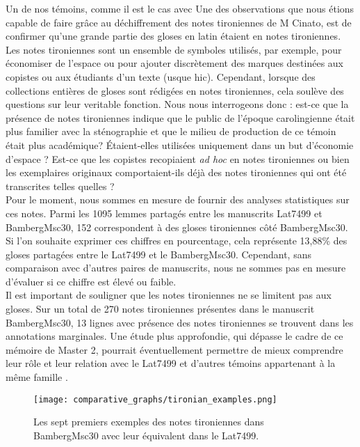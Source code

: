 \documentclass[a4paper, twoside, 12pt]{book}
\begin{document}
{Un de nos témoins, comme il est le cas avec 
Une des observations que nous étions capable de faire grâce au déchiffrement des notes tironiennes de M Cinato, est de confirmer qu'une grande partie des  gloses en latin étaient  en notes tironiennes. 
Les notes tironiennes sont un ensemble de symboles utilisés, par exemple, pour économiser de l'espace ou pour ajouter discrètement des marques destinées aux copistes ou aux étudiants d'un texte (usque hic). Cependant, lorsque des collections entières de gloses sont rédigées en notes tironiennes, cela soulève des questions sur leur veritable fonction. Nous nous interrogeons donc : est-ce que la présence de notes tironiennes indique que le public de l'époque carolingienne était plus familier avec la sténographie et que le milieu de production de ce témoin était plus \og{}académique\fg{}? Étaient-elles utilisées uniquement dans un but d'économie d'espace ? Est-ce que les copistes recopiaient \textit{ad hoc} en notes tironiennes ou bien les exemplaires originaux comportaient-ils déjà des notes tironiennes qui ont été transcrites telles quelles ?\\

Pour le moment, nous sommes en mesure de fournir des analyses statistiques sur ces notes. Parmi les 1095 lemmes partagés entre les manuscrits Lat7499 et BambergMsc30, 152 correspondent à des gloses tironiennes côté BambergMsc30. Si l'on souhaite exprimer ces chiffres en pourcentage, cela représente 13,88\% des gloses partagées entre le Lat7499 et le BambergMsc30. Cependant, sans comparaison avec d'autres paires de manuscrits, nous ne sommes pas en mesure d'évaluer si ce chiffre est élevé ou faible.\\

Il est important de souligner que les notes tironiennes ne se limitent pas aux gloses. Sur un total de 270 notes tironiennes présentes dans le manuscrit BambergMsc30, 13 lignes avec présence des notes tironiennes se trouvent dans les annotations marginales. Une étude plus approfondie, qui dépasse le cadre de ce mémoire de Master 2, pourrait éventuellement permettre de mieux comprendre leur rôle et leur relation avec le Lat7499 et d'autres témoins appartenant à la même \og{} famille \fg{}.

\begin{figure}[H]
    \texttt{[image: comparative\_graphs/tironian\_examples.png]}
    \caption{Les sept premiers exemples des notes tironiennes dans BambergMsc30 avec leur équivalent dans le Lat7499.}
\end{figure}


}
\end{document}

